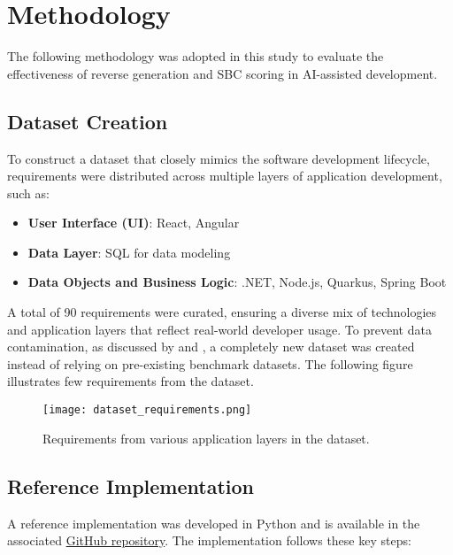 \documentclass{article}
\begin{document}
\section{Methodology}

The following methodology was adopted in this study to evaluate the effectiveness of reverse generation and SBC scoring in AI-assisted development.

\subsection{Dataset Creation}

To construct a dataset that closely mimics the software development lifecycle, requirements were distributed across multiple layers of application development, such as:

\begin{itemize}
    \item \textbf{User Interface (UI)}: React, Angular
    \item \textbf{Data Layer}: SQL for data modeling
    \item \textbf{Data Objects and Business Logic}: .NET, Node.js, Quarkus, Spring Boot
\end{itemize}

A total of 90 requirements were curated, ensuring a diverse mix of technologies and application layers that reflect real-world developer usage. To prevent data contamination, as discussed by \cite{Aiyyappa2022} and \cite{terry2024icescore}, a completely new dataset was created instead of relying on pre-existing benchmark datasets.
The following figure illustrates few requirements from the dataset.
\vspace{-10pt}
\begin{figure}[H]
    \centering
    \texttt{[image: dataset\_requirements.png]}
    \caption{Requirements from various application layers in the dataset.}
    \label{fig:sample1}
\end{figure}


\subsection{Reference Implementation}

A reference implementation was developed in Python and is available in the associated \href{https://github.com/AhilanPonnusamy/Reverse-Generation-and-SBC-Metric--Reference-Implementation}{GitHub repository}. The implementation follows these key steps:
\end{document}
